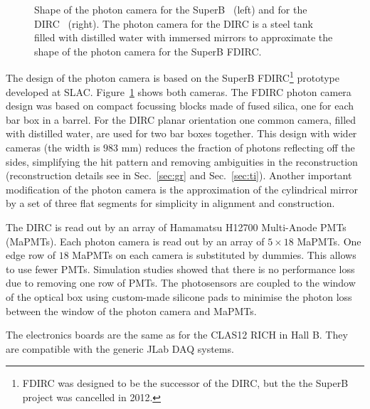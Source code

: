 \begin{figure}[!h]
\begin{minipage}{0.4\textwidth}
\vspace{0.5cm}
\end{minipage}
\caption{\label{pic:ob} Shape of the photon camera for the SuperB~\cite{fdirc} (left) and for the \gluex DIRC~\cite{tdr} (right). The photon camera for the \gluex DIRC is a steel tank filled with distilled water with immersed mirrors to approximate the shape of the photon camera for the SuperB FDIRC.}
\end{figure}

The design of the photon camera is based on the SuperB FDIRC\footnote{FDIRC was designed to be the successor of the \babar DIRC, but the the SuperB project was cancelled in 2012.} prototype~\cite{fdirc} developed at SLAC. Figure~\ref{pic:ob} shows both cameras. The FDIRC photon camera design was based on compact focussing blocks made of fused silica, one for each bar box in a barrel. For the \gluex DIRC planar orientation one common camera, filled with distilled water, are used for two bar boxes together. This design with wider cameras (the width is $983$ mm) reduces the fraction of photons reflecting off the sides, simplifying the hit pattern and removing ambiguities in the reconstruction (reconstruction details see in Sec.~\ref{sec:gr} and Sec.~\ref{sec:ti}). Another important modification of the photon camera is the approximation of the cylindrical mirror by a set of three flat segments for simplicity in alignment and construction. 

The \gluex DIRC is read out by an array of Hamamatsu H12700 Multi-Anode PMTs (MaPMTs). Each photon camera is read out by an array of $5 \times 18$ MaPMTs. One edge row of $18$ MaPMTs on each camera is substituted by dummies. This allows to use fewer PMTs. Simulation studies showed that there is no performance loss due to removing one row of PMTs. The photosensors are coupled to the window of the optical box using custom-made silicone pads to minimise the photon loss between the window of the photon camera and MaPMTs. 

The electronics boards are the same as for the CLAS12 RICH in Hall B. They are compatible with the generic JLab DAQ systems.
